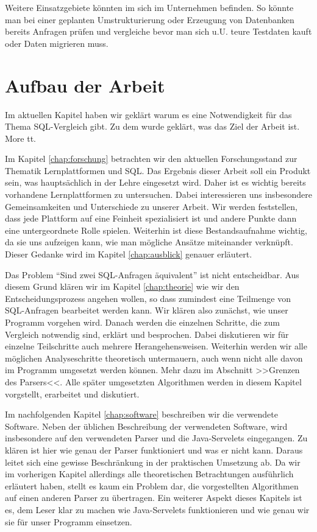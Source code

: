 Weitere Einsatzgebiete könnten im sich im Unternehmen befinden. So könnte man bei einer geplanten Umstrukturierung oder Erzeugung von Datenbanken bereits Anfragen prüfen und vergleiche bevor man sich u.U. teure Testdaten kauft oder Daten migrieren muss.

\section{Aufbau der Arbeit}

Im aktuellen Kapitel haben wir geklärt warum es eine Notwendigkeit für das Thema SQL-Vergleich gibt. Zu dem wurde geklärt, was das Ziel der Arbeit ist. More tt.

Im Kapitel \ref{chap:forschung} betrachten wir den aktuellen Forschungsstand zur Thematik Lernplattformen und SQL. Das Ergebnis dieser Arbeit soll ein Produkt sein, was hauptsächlich in der Lehre eingesetzt wird. Daher ist es wichtig bereits vorhandene Lernplattformen zu untersuchen. Dabei interessieren uns insbesondere Gemeinsamkeiten und Unterschiede zu unserer Arbeit. Wir werden feststellen, dass jede Plattform auf eine Feinheit spezialisiert ist und andere Punkte dann eine untergeordnete Rolle spielen. Weiterhin ist diese Bestandsaufnahme wichtig, da sie uns aufzeigen kann, wie man mögliche Ansätze miteinander verknüpft. Dieser Gedanke wird im Kapitel \ref{chap:ausblick} genauer erläutert.

Das Problem ``Sind zwei SQL-Anfragen äquivalent'' ist nicht entscheidbar. Aus diesem Grund klären wir im Kapitel \ref{chap:theorie} wie wir den Entscheidungsprozess angehen wollen, so dass zumindest eine Teilmenge von SQL-Anfragen bearbeitet werden kann. Wir klären also zunächst, wie unser Programm vorgehen wird. Danach werden die einzelnen Schritte, die zum Vergleich notwendig sind, erklärt und besprochen. Dabei diskutieren wir für einzelne Teilschritte auch mehrere Herangehensweisen. Weiterhin werden wir alle möglichen Analyseschritte theoretisch untermauern, auch wenn nicht alle davon im Programm umgesetzt werden können. Mehr dazu im Abschnitt >>Grenzen des Parsers<<. Alle später umgesetzten Algorithmen werden in diesem Kapitel vorgstellt, erarbeitet und diskutiert.


Im nachfolgenden Kapitel \ref{chap:software} beschreiben wir die verwendete Software. Neben der üblichen Beschreibung der verwendeten Software, wird insbesondere auf den verwendeten Parser und die Java-Servelets eingegangen. Zu klären ist hier wie genau der Parser funktioniert und was er nicht kann. Daraus leitet sich eine gewisse Beschränkung in der praktischen Umsetzung ab. Da wir im vorherigen Kapitel allerdings alle theoretischen Betrachtungen ausführlich erläutert haben, stellt es kaum ein Problem dar, die vorgestellten Algorithmen auf einen anderen Parser zu übertragen. Ein weiterer Aspekt dieses Kapitels ist es, dem Leser klar zu machen wie Java-Servelets funktionieren und wie genau wir sie für unser Programm einsetzen.

